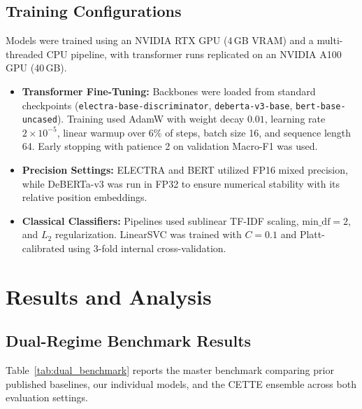 \documentclass[10pt,conference]{IEEEtran}
\begin{document}
\subsection{Training Configurations}
Models were trained using an NVIDIA RTX GPU (4\,GB VRAM) and a multi-threaded CPU pipeline, with transformer runs replicated on an NVIDIA A100 GPU (40\,GB).
\begin{itemize}
    \item \textbf{Transformer Fine-Tuning:} Backbones were loaded from standard checkpoints (\texttt{electra-base-discriminator}, \texttt{deberta-v3-base}, \texttt{bert-base-uncased}). Training used AdamW with weight decay $0.01$, learning rate $2 \times 10^{-5}$, linear warmup over 6\% of steps, batch size 16, and sequence length 64. Early stopping with patience 2 on validation Macro-F1 was used.
    \item \textbf{Precision Settings:} ELECTRA and BERT utilized FP16 mixed precision, while DeBERTa-v3 was run in FP32 to ensure numerical stability with its relative position embeddings.
    \item \textbf{Classical Classifiers:} Pipelines used sublinear TF-IDF scaling, $\text{min\_df} = 2$, and $L_2$ regularization. LinearSVC was trained with $C = 0.1$ and Platt-calibrated using 3-fold internal cross-validation.
\end{itemize}

\section{Results and Analysis}
\subsection{Dual-Regime Benchmark Results}
Table~\ref{tab:dual_benchmark} reports the master benchmark comparing prior published baselines, our individual models, and the CETTE ensemble across both evaluation settings.
\end{document}
